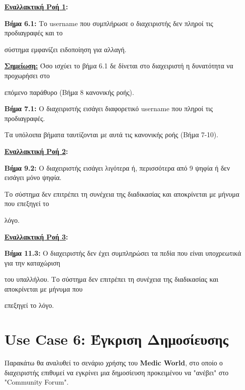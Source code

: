 \documentclass{article}
\begin{document}
 
 \textbf{\underline{Εναλλακτική Ροή 1}:} \vspace{0.2cm}
\par \textbf{Βήμα 6.1:} Το username που συμπλήρωσε ο διαχειριστής δεν πληροί τις προδιαγραφές και το \par σύστημα εμφανίζει ειδοποίηση για αλλαγή.\vspace{0.1cm}

\par \textbf{\underline{Σημείωση:}} Όσο ισχύει το βήμα 6.1 δε δίνεται στο διαχειριστή η δυνατότητα να προχωρήσει στο \par επόμενο παράθυρο (Βήμα 8 κανονικής ροής). \vspace{0.1cm}

\par \textbf{Βήμα 7.1:} Ο διαχειριστής εισάγει διαφορετικό username που πληροί τις προδιαγραφές.\vspace{0.1cm}

\par Τα υπόλοιπα βήματα ταυτίζονται με αυτά τις κανονικής ροής (Βήμα 7-10). \vspace{0.2cm}

\textbf{\underline{Εναλλακτική Ροή 2}:} \vspace{0.2cm}
\par \textbf{Βήμα 9.2:} Ο διαχειριστής εισάγει λιγότερα ή, περισσότερα από 9 ψηφία ή δεν εισάγει μόνο ψηφία. \par Το σύστημα δεν επιτρέπει τη συνέχεια της διαδικασίας και αποκρίνεται με μήνυμα που επεξηγεί το \par λόγο.  \vspace{0.2cm}

\textbf{\underline{Εναλλακτική Ροή 3}:} \vspace{0.2cm}
\par \textbf{Βήμα 11.3:} Ο διαχειριστής δεν έχει συμπληρώσει τα πεδία που είναι υποχρεωτικά για την καταχώριση \par του υπαλλήλου. Το σύστημα δεν επιτρέπει τη συνέχεια της διαδικασίας και αποκρίνεται με μήνυμα που \par επεξηγεί το λόγο. 

\section{Use Case 6: Έγκριση Δημοσίευσης}

Παρακάτω θα αναλυθεί το σενάριο χρήσης του \textbf{Medic World}, στο οποίο ο διαχειριστής επιθυμεί να εγκρίνει μια δημοσίευση προκειμένου να "ανέβει" στο "Community Forum".
\end{document}
